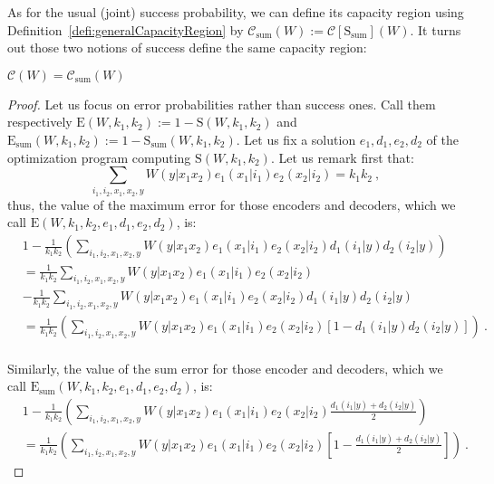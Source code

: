 As for the usual (joint) success probability, we can define its capacity region using Definition~\ref{defi:generalCapacityRegion} by $\mathcal{C}_{\text{sum}}(W) := \mathcal{C}[\mathrm{S}_{\text{sum}}](W)$. It turns out those two notions of success define the same capacity region:
\begin{proposition}
  \label{prop:CapaSumJoint}
  $\mathcal{C}(W) = \mathcal{C}_{\text{sum}}(W)$
\end{proposition}
\begin{proof}
  Let us focus on error probabilities rather than success ones. Call them respectively $\mathrm{E}(W,k_1,k_2) := 1-\mathrm{S}(W,k_1,k_2)$ and $\mathrm{E}_{\text{sum}}(W,k_1,k_2) := 1-\mathrm{S}_{\text{sum}}(W,k_1,k_2)$. Let us fix a solution $e_1,d_1,e_2,d_2$ of the optimization program computing $\mathrm{S}(W,k_1,k_2)$. Let us remark first that:
  \[ \sum_{i_1,i_2,x_1,x_2,y} W(y|x_1x_2)e_1(x_1|i_1)e_2(x_2|i_2) = k_1k_2\ , \]
  thus, the value of the maximum error for those encoders and decoders, which we call $\mathrm{E}(W,k_1,k_2,e_1,d_1,e_2,d_2)$, is:
\begin{equation}
  \begin{aligned}
    & 1 -  \frac{1}{k_1k_2}\left(\sum_{i_1,i_2,x_1,x_2,y} W(y|x_1x_2)e_1(x_1|i_1)e_2(x_2|i_2)d_1(i_1|y)d_2(i_2|y)\right)\\
    &=\frac{1}{k_1k_2}\sum_{i_1,i_2,x_1,x_2,y} W(y|x_1x_2)e_1(x_1|i_1)e_2(x_2|i_2)\\
    &-\frac{1}{k_1k_2}\sum_{i_1,i_2,x_1,x_2,y} W(y|x_1x_2)e_1(x_1|i_1)e_2(x_2|i_2)d_1(i_1|y)d_2(i_2|y)\\
    &=\frac{1}{k_1k_2}\left(\sum_{i_1,i_2,x_1,x_2,y} W(y|x_1x_2)e_1(x_1|i_1)e_2(x_2|i_2)\left[1-d_1(i_1|y)d_2(i_2|y)\right]\right) \ .\\
  \end{aligned}
\end{equation}

Similarly, the value of the sum error for those encoder and decoders, which we call $\mathrm{E}_{\text{sum}}(W,k_1,k_2,e_1,d_1,e_2,d_2)$, is:
\begin{equation}
  \begin{aligned}
    &1 -  \frac{1}{k_1k_2}\left(\sum_{i_1,i_2,x_1,x_2,y} W(y|x_1x_2)e_1(x_1|i_1)e_2(x_2|i_2)\frac{d_1(i_1|y)+d_2(i_2|y)}{2}\right)\\
    &= \frac{1}{k_1k_2}\left(\sum_{i_1,i_2,x_1,x_2,y} W(y|x_1x_2)e_1(x_1|i_1)e_2(x_2|i_2)\left[1-\frac{d_1(i_1|y)+d_2(i_2|y)}{2}\right]\right) \ .
  \end{aligned}
\end{equation}


\end{proof}
